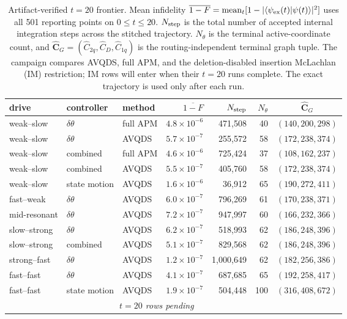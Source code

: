 \begin{table}[t]
\caption{Artifact-verified $t=20$ frontier.  Mean infidelity $\overline{1-F}=\operatorname{mean}_t[1-|\langle\psi_{\rm ex}(t)|\psi(t)\rangle|^2]$ uses all 501 reporting points on $0\le t\le20$.  $N_{\rm step}$ is the total number of accepted internal integration steps across the stitched trajectory.  $N_\theta$ is the terminal active-coordinate count, and $\widehat{\boldsymbol C}_G=(\widehat C_{2q},\widehat C_D,\widehat C_{1q})$ is the routing-independent terminal graph tuple.  The campaign compares AVQDS, full APM, and the deletion-disabled insertion McLachlan (IM) restriction; IM rows will enter when their $t=20$ runs complete.  The exact trajectory is used only after each run.}
\label{tab:t20_provisional_frontier}
\centering\scriptsize
\setlength{\tabcolsep}{6pt}
\begin{tabular}{lllrrrc}
\toprule
drive & controller & method & $\overline{1-F}$ & $N_{\rm step}$ & $N_\theta$ & $\widehat{\boldsymbol C}_G$ \\
\midrule
weak--slow & $\delta\theta$ & full APM & $4.8\!\times\!10^{-6}$ & 471,508 & 40 & $(140,200,298)$ \\
weak--slow & $\delta\theta$ & AVQDS & $5.7\!\times\!10^{-7}$ & 255,572 & 58 & $(172,238,374)$ \\
weak--slow & combined & full APM & $4.6\!\times\!10^{-6}$ & 725,424 & 37 & $(108,162,237)$ \\
weak--slow & combined & AVQDS & $5.5\!\times\!10^{-7}$ & 405,760 & 58 & $(172,238,374)$ \\
weak--slow & state motion & AVQDS & $1.6\!\times\!10^{-6}$ & 36,912 & 65 & $(190,272,411)$ \\
fast--weak & $\delta\theta$ & AVQDS & $6.0\!\times\!10^{-7}$ & 796,269 & 61 & $(170,238,371)$ \\
mid-resonant & $\delta\theta$ & AVQDS & $7.2\!\times\!10^{-7}$ & 947,997 & 60 & $(166,232,366)$ \\
slow--strong & $\delta\theta$ & AVQDS & $6.2\!\times\!10^{-7}$ & 518,993 & 62 & $(186,248,396)$ \\
slow--strong & combined & AVQDS & $5.1\!\times\!10^{-7}$ & 829,568 & 62 & $(186,248,396)$ \\
strong--fast & $\delta\theta$ & AVQDS & $1.2\!\times\!10^{-7}$ & 1,000,649 & 62 & $(182,256,386)$ \\
fast--fast & $\delta\theta$ & AVQDS & $4.1\!\times\!10^{-7}$ & 687,685 & 65 & $(192,258,417)$ \\
fast--fast & state motion & AVQDS & $1.9\!\times\!10^{-7}$ & 504,448 & 100 & $(316,408,672)$ \\
\addlinespace[2pt]
\multicolumn{3}{l}{insertion McLachlan (IM)} & \multicolumn{4}{c}{\textit{$t=20$ rows pending}} \\
\bottomrule
\end{tabular}
\end{table}
